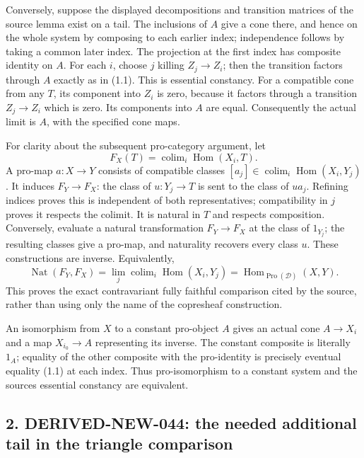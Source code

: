 Conversely,\allowbreak{} suppose the displayed decompositions and transition matrices of the source lemma exist on a tail. The inclusions of \(A\) give a cone there,\allowbreak{} and hence on the whole system by composing to each earlier index; independence follows by taking a common later index. The projection at the first index has composite identity on \(A\). For each \(i\),\allowbreak{} choose \(j\) killing \(Z_j\to Z_i\); then the transition factors through \(A\) exactly as in (1.1)\allowbreak{}. This is essential constancy. For a compatible cone from any \(T\),\allowbreak{} its component into \(Z_i\) is zero,\allowbreak{} because it factors through a transition \(Z_j\to Z_i\) which is zero. Its components into \(A\) are equal. Consequently the actual limit is \(A\),\allowbreak{} with the specified cone maps.

For clarity about the subsequent pro-category argument,\allowbreak{} let \[
F_X(T)=\operatorname{colim}_i\operatorname{Hom}(X_i,T).
\] A pro-map \(a:X\to Y\) consists of compatible classes \([a_j]\in\operatorname{colim}_i\operatorname{Hom}(X_i,Y_j)\). It induces \(F_Y\to F_X\):\allowbreak{} the class of \(u:Y_j\to T\) is sent to the class of \(u a_j\). Refining indices proves this is independent of both representatives; compatibility in \(j\) proves it respects the colimit. It is natural in \(T\) and respects composition. Conversely,\allowbreak{} evaluate a natural transformation \(F_Y\to F_X\) at the class of \(1_{Y_j}\); the resulting classes give a pro-map,\allowbreak{} and naturality recovers every class \(u\). These constructions are inverse. Equivalently,\allowbreak{} \[
\operatorname{Nat}(F_Y,F_X)
 =\lim_j\operatorname{colim}_i\operatorname{Hom}(X_i,Y_j)
 =\operatorname{Hom}_{\operatorname{Pro}(\mathcal D)}(X,Y). \tag{1.2}
\] This proves the exact contravariant fully faithful comparison cited by the source,\allowbreak{} rather than using only the name of the copresheaf construction.

An isomorphism from \(X\) to a constant pro-object \(A\) gives an actual cone \(A\to X_i\) and a map \(X_{i_0}\to A\) representing its inverse. The constant composite is literally \(1_A\); equality of the other composite with the pro-identity is precisely eventual equality (1.1)\allowbreak{} at each index. Thus pro-isomorphism to a constant system and the source\textquotesingle s essential constancy are equivalent.

\subsection{\texorpdfstring{2. DERIVED-NEW-044:\allowbreak{} the needed additional tail in the triangle comparison}{2.  the needed additional tail in the triangle comparison}}\label{proofs-12380-12604-derived-new-044-the-needed-additional-tail-in-the-triangle-comparison}

